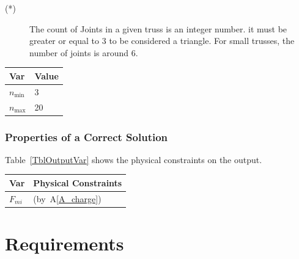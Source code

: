 \documentclass[12pt]{article}
\newcommand{\aref}[1]{A\ref{#1}}
\begin{document}
\noindent 
\begin{description}

\item[(*)] The count of Joints in a given truss is an integer number. it must be greater or equal to 3 to be considered a triangle. For small trusses, the number of joints is around 6.
\end{description}

\begin{table}[!h]
\caption{Specification Parameter Values} \label{TblSpecParams}
\renewcommand{\arraystretch}{1.2}
\noindent \begin{longtable*}{l l} 
  \toprule
  \textbf{Var} & \textbf{Value} \\
  \midrule 
  $n_\text{min}$ & 3 \\
  $n_\text{max}$ & 20\\
  \bottomrule
\end{longtable*}
\end{table}

\subsubsection{Properties of a Correct Solution} \label{sec_CorrectSolution}

\noindent
Table~\ref{TblOutputVar} shows the physical constraints on the output.

\begin{table}[!h]
\caption{Output Variables} \label{TblOutputVar}
\renewcommand{\arraystretch}{1.2}
\noindent \begin{longtable*}{l l} 
  \toprule
  \textbf{Var} & \textbf{Physical Constraints} \\
  \midrule 
  $F_{mi}$ &  (by~\aref{A_charge})
  \\
  \bottomrule
\end{longtable*}
\end{table}


\section{Requirements}

\end{document}

